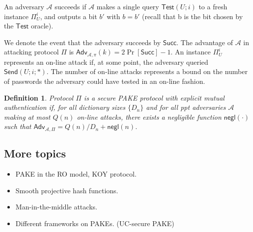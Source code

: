 \documentclass[11pt]{article}
\newcommand{\adv}{\mathcal{A}}
\newcommand{\class}[1]{{\ensuremath{\mathsf{#1}}}}
\newcommand{\negl}{\class{negl}}
\newcommand{\Adv}{\class{Adv}}
\newcommand{\Succ}{\class{Succ}}
\newcommand{\iU}{\ensuremath{\Pi^i_U}}
\newtheorem{defn}[thm]{Definition}
\begin{document}
An adversary $\adv$ succeeds if $\adv$ makes a single query $\class{Test}(U; i)$ to a fresh instance $\iU$, and outputs a bit $b'$ with $b=b'$ (recall that b is the bit chosen by the $\class{Test}$ oracle).

We denote the event that the adversary succeeds by $\class{Succ}$. The advantage of $\adv$ in attacking protocol $\Pi$ is $\Adv_{\adv, \pi}(k) = 2\Pr[\Succ] - 1$. An instance $\iU$ represents an on-line attack if, at some point, the adversary queried $\class{Send}(U; i; *)$. The number of on-line attacks represents a bound on the number of passwords the adversary could have tested in an on-line fashion.


\begin{defn}
Protocol $\Pi$ is a secure PAKE protocol with explicit mutual authentication if, for all
dictionary sizes $\{D_n\}$ and for all ppt adversaries $\adv$ making at most $Q(n)$ on-line attacks, there
exists a negligible function $\negl(\cdot)$ such that $\Adv_{\adv,\Pi} = Q(n)/D_n + \negl(n)$.
\end{defn}
 
 
\subsection{More topics}
\begin{itemize}
\item PAKE in the RO model, KOY protocol.
\item Smooth projective hash functions.
\item Man-in-the-middle attacks.
\item Different frameworks on PAKEs. (UC-secure PAKE)
\end{itemize}



\end{document}
